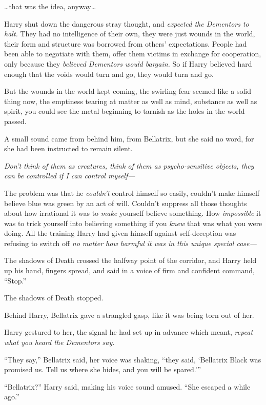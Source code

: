 …that was the idea, anyway…

Harry shut down the dangerous stray thought, and \emph{expected the Dementors to halt.} They had no intelligence of their own, they were just wounds in the world, their form and structure was borrowed from others’ expectations. People had been able to negotiate with them, offer them victims in exchange for cooperation, only because they \emph{believed Dementors would bargain.} So if Harry believed hard enough that the voids would turn and go, they would turn and go.

But the wounds in the world kept coming, the swirling fear seemed like a solid thing now, the emptiness tearing at matter as well as mind, substance as well as spirit, you could see the metal beginning to tarnish as the holes in the world passed.

A small sound came from behind him, from Bellatrix, but she said no word, for she had been instructed to remain silent.

\emph{Don’t think of them as creatures, think of them as psycho-sensitive objects, they can be controlled if I can control myself—}

The problem was that he \emph{couldn’t} control himself so easily, couldn’t make himself believe blue was green by an act of will. Couldn’t suppress all those thoughts about how irrational it was to \emph{make} yourself believe something. How \emph{impossible} it was to trick yourself into believing something if you \emph{knew} that was what you were doing. All the training Harry had given himself against self-deception was refusing to switch off \emph{no matter how harmful it was in this unique special case—}

The shadows of Death crossed the halfway point of the corridor, and Harry held up his hand, fingers spread, and said in a voice of firm and confident command,
“Stop.”

The shadows of Death stopped.

Behind Harry, Bellatrix gave a strangled gasp, like it was being torn out of her.

Harry gestured to her, the signal he had set up in advance which meant, \emph{repeat what you heard the Dementors say.}

“They say,” Bellatrix said, her voice was shaking, “they said, ‘Bellatrix Black was promised us. Tell us where she hides, and you will be spared.’”

“Bellatrix?” Harry said, making his voice sound amused.
“She escaped a while ago.”

